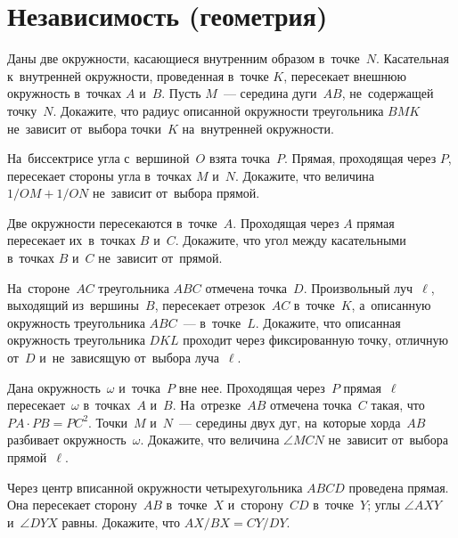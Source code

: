 
\section*{Независимость (геометрия)}


\begin{problems}

\item
Даны две окружности, касающиеся внутренним образом в~точке~$N$.
Касательная к~внутренней окружности, проведенная в~точке $K$, пересекает
внешнюю окружность в~точках $A$ и~$B$.
Пусть $M$~--- середина дуги~$AB$, не~содержащей точку~$N$.
Докажите, что радиус описанной окружности треугольника $BMK$ не~зависит
от~выбора точки~$K$ на~внутренней окружности.

\item
На~биссектрисе угла с~вершиной~$O$ взята точка~$P$.
Прямая, проходящая через $P$, пересекает стороны угла в~точках $M$ и~$N$.
Докажите, что величина $1 / OM + 1 / ON$ не~зависит от~выбора прямой.

\item
Две окружности пересекаются в~точке~$A$.
Проходящая через $A$ прямая пересекает их~в~точках $B$ и~$C$.
Докажите, что угол между касательными в~точках $B$ и~$C$ не~зависит от~прямой.

\item
На~стороне~$AC$ треугольника $ABC$ отмечена точка~$D$.
Произвольный луч~$\ell$, выходящий из~вершины~$B$, пересекает отрезок~$AC$
в~точке~$K$, а~описанную окружность треугольника $ABC$~--- в~точке~$L$.
Докажите, что описанная окружность треугольника $DKL$ проходит через
фиксированную точку, отличную от~$D$ и~не~зависящую от~выбора луча~$\ell$.

\item
Дана окружность~$\omega$ и~точка~$P$ вне нее.
Проходящая через~$P$ прямая~$\ell$ пересекает~$\omega$ в~точках~$A$ и~$B$.
На~отрезке~$AB$ отмечена точка~$C$ такая, что~$PA\cdot PB=PC^2$.
Точки~$M$ и~$N$~--- середины двух дуг, на~которые хорда~$AB$ разбивает
окружность~$\omega$.
Докажите, что величина $\angle MCN$ не~зависит от~выбора прямой~$\ell$.

\item
Через центр вписанной окружности четырехугольника $ABCD$ проведена
прямая.
Она пересекает сторону~$AB$ в~точке~$X$ и~сторону~$CD$ в~точке~$Y$;
углы $\angle AXY$ и~$\angle DYX$ равны.
Докажите, что $AX / BX = CY / DY$.


\end{problems}
